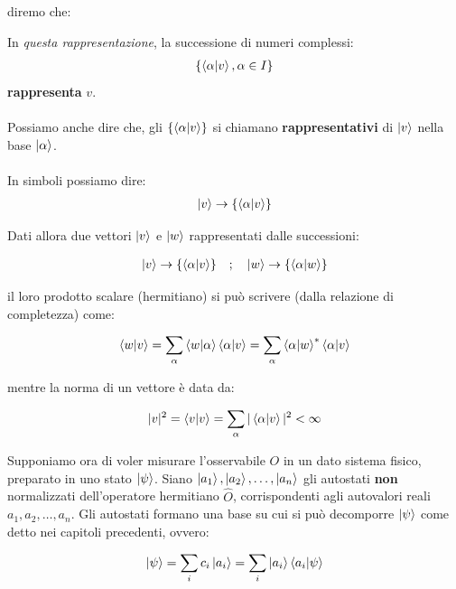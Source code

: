 	diremo che:
	
\begin{mydef}
	In \textit{questa rappresentazione}, la successione di numeri complessi: 
\begin{align*}
	\qty{\braket{\alpha}{v}, \alpha \in I}
\end{align*}
	\textbf{rappresenta} $v$.
	\\
	\\
	Possiamo anche dire che, gli $\qty{\braket{\alpha}{v}}$ si chiamano \textbf{rappresentativi} di $\ket{v}$ nella base $\ket{\alpha}$. 
	\\
	\\
	In simboli possiamo dire:
\begin{align*}
	\ket{v} \to \qty{\braket{\alpha}{v}}
\end{align*}
\end{mydef}

	Dati allora due vettori $\ket{v}$ e $\ket{w}$ rappresentati dalle successioni:
	
\begin{align*} 
	\ket{v} \to \qty{\braket{\alpha}{v}} \quad ; \quad \ket{w} \to \qty{\braket{\alpha}{w}}
\end{align*}

	il loro prodotto scalare (hermitiano) si può scrivere (dalla relazione di completezza) come:
	
\begin{align*}
	\braket{w}{v} = \sum_{\alpha} \braket{w}{\alpha} \braket{\alpha}{v} = \sum_{\alpha} \braket{\alpha}{w}^* \braket{\alpha}{v}
\end{align*}

	mentre la norma di un vettore è data da:
	
\begin{align*}
	|v|^2 = \braket{v} = \sum_{\alpha} | \braket{\alpha}{v} |^2 < \infty
\end{align*}

	Supponiamo ora di voler misurare l'osservabile $O$ in un dato sistema fisico, preparato in uno stato $\ket{\psi}$. Siano $\ket{a_1}, \ket{a_2}, \ldots, \ket{a_n}$ gli autostati \textbf{non} normalizzati dell'operatore hermitiano $\hat{O}$, corrispondenti agli autovalori reali $a_1, a_2, \ldots, a_n$. Gli autostati formano una base su cui si può decomporre $\ket{\psi}$ come detto nei capitoli precedenti, ovvero:
	
\begin{align*}
	\ket{\psi} = \sum_i c_i \ket{a_i} = \sum_i \ket{a_i} \braket{a_i}{\psi}
\end{align*}

